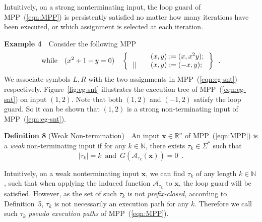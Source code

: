 \documentclass{article}
\newcommand{\while}{{\rm while}}
\newcommand{\A}{\mathcal{A}}
\newcommand{\xx}{\mathbf{x}}
\begin{document}
Intuitively, on a strong nonterminating input, the loop guard of MPP~(\ref{eqn:MPP}) is persistently satisfied no matter how many iterations have been executed, or which assignment is selected at each iteration.

{\bf Example 4}~~{Consider the following MPP
\begin{equation}\label{eqn:eg-snt}
\while \quad (x^2+1-y=0) \quad \left\{
\begin{array}{ll}
& \quad (x,y) := (x,x^2y); \\
\,|| & \quad (x,y) := (-x,y); \\
\end{array}
\,\right\} \enspace .
\end{equation}
We associate symbols $L,R$ with the two assignments in MPP~(\ref{eqn:eg-snt}) respectively. Figure~\ref{fig:eg-snt} illustrates the execution tree of MPP~(\ref{eqn:eg-snt}) on input $(1,2)$. Note that both $(1,2)$ and $(-1,2)$ satisfy the loop guard. So it can be shown that $(1,2)$ is a strong non-terminating input of MPP~(\ref{eqn:eg-snt}).}

{\bf Definition 8} (Weak Non-termination)~~{An input $\xx \in \mathbb{R}^n$ of MPP~(\ref{eqn:MPP}) is a \emph{weak} non-terminating input if for any $k \in \mathbb{N}$, there exists $\tau_k \in\Sigma^*$ such that
\begin{equation}\label{eqn:wnt}
|\tau_k|=k \,\mbox{ and }\, G(\A_{\tau_k}(\xx))=0 \enspace.
\end{equation}}

Intuitively, on a weak nonterminating input $\xx$, we can find $\tau_k$ of any length $k \in \mathbb{N}$, such that when applying the induced function $\A_{\tau_k}$ to $\xx$, the loop guard will be satisfied. However, as the set of such $\tau_k$ is not \emph{prefix-closed}, according to Definition~5, $\tau_k$ is not necessarily an execution path for any $k$. Therefore we call such $\tau_k$ \emph{pseudo execution paths} of MPP~(\ref{eqn:MPP}).
\end{document}
